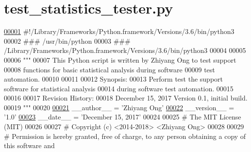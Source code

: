 \hypertarget{test__statistics__tester_8py_source}{}\section{test\+\_\+statistics\+\_\+tester.\+py}
\label{test__statistics__tester_8py_source}

\begin{DoxyCode}
\hypertarget{test__statistics__tester_8py_source_l00001}{}\hyperlink{namespacestatistics_1_1test__statistics__tester}{00001} \textcolor{comment}{#!/Library/Frameworks/Python.framework/Versions/3.6/bin/python3}
00002 \textcolor{comment}{### /usr/bin/python}
00003 \textcolor{comment}{### /Library/Frameworks/Python.framework/Versions/3.6/bin/python3}
00004 
00005 
00006 \textcolor{stringliteral}{"""}
00007 \textcolor{stringliteral}{    This Python script is written by Zhiyang Ong to test support}
00008 \textcolor{stringliteral}{        functions for basic statistical analysis during software}
00009 \textcolor{stringliteral}{        test automation.}
00010 \textcolor{stringliteral}{}
00011 \textcolor{stringliteral}{}
00012 \textcolor{stringliteral}{    Synopsis:}
00013 \textcolor{stringliteral}{    Perform test the support software for statistical analysis}
00014 \textcolor{stringliteral}{        during software test automation.}
00015 \textcolor{stringliteral}{}
00016 \textcolor{stringliteral}{}
00017 \textcolor{stringliteral}{    Revision History:}
00018 \textcolor{stringliteral}{    December 15, 2017           Version 0.1, initial build.}
00019 \textcolor{stringliteral}{"""}
00020 
\hypertarget{test__statistics__tester_8py_source_l00021}{}\hyperlink{namespacestatistics_1_1test__statistics__tester_ab9ecb1d5ecfb751c8b2a27ac138a0eed}{00021} \_\_author\_\_ = \textcolor{stringliteral}{'Zhiyang Ong'}
\hypertarget{test__statistics__tester_8py_source_l00022}{}\hyperlink{namespacestatistics_1_1test__statistics__tester_a29677162e8392e196da563156d924f5d}{00022} \_\_version\_\_ = \textcolor{stringliteral}{'1.0'}
\hypertarget{test__statistics__tester_8py_source_l00023}{}\hyperlink{namespacestatistics_1_1test__statistics__tester_a0d2103581aebe4f7dfb05775432fa386}{00023} \_\_date\_\_ = \textcolor{stringliteral}{'December 15, 2017'}
00024 
00025 \textcolor{comment}{#   The MIT License (MIT)}
00026 
00027 \textcolor{comment}{#   Copyright (c) <2014-2018> <Zhiyang Ong>}
00028 
00029 \textcolor{comment}{#   Permission is hereby granted, free of charge, to any person obtaining a copy of this software and
}
\end{DoxyCode}
